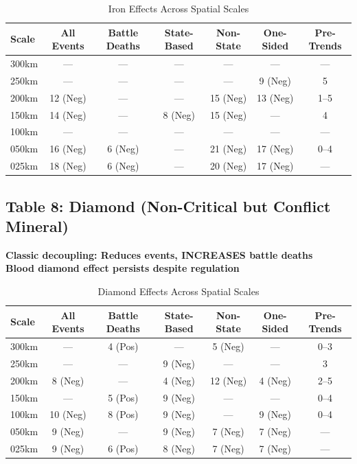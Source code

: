\documentclass[11pt]{article}
\begin{document}
\begin{table}[H]
\centering
\caption{Iron Effects Across Spatial Scales}
\begin{tabular}{lcccccc}
\toprule
Scale & All Events & Battle Deaths & State-Based & Non-State & One-Sided & Pre-Trends \\
\midrule
300km & ---       & ---           & ---         & ---       & ---       & ---        \\
250km & ---       & ---           & ---         & ---       & 9 (Neg)   & 5          \\
200km & 12 (Neg)  & ---           & ---         & 15 (Neg)  & 13 (Neg)  & 1--5       \\
150km & 14 (Neg)  & ---           & 8 (Neg)     & 15 (Neg)  & ---       & 4          \\
100km & ---       & ---           & ---         & ---       & ---       & ---        \\
050km & 16 (Neg)  & 6 (Neg)       & ---         & 21 (Neg)  & 17 (Neg)  & 0--4       \\
025km & 18 (Neg)  & 6 (Neg)       & ---         & 20 (Neg)  & 17 (Neg)  & ---        \\
\bottomrule
\end{tabular}
\end{table}

\subsection{Table 8: Diamond (Non-Critical but Conflict Mineral)}

\textbf{Classic decoupling: Reduces events, INCREASES battle deaths}\\
\textbf{Blood diamond effect persists despite regulation}

\begin{table}[H]
\centering
\caption{Diamond Effects Across Spatial Scales}
\begin{tabular}{lcccccc}
\toprule
Scale & All Events & Battle Deaths & State-Based & Non-State & One-Sided & Pre-Trends \\
\midrule
300km & ---       & 4 (Pos)       & ---         & 5 (Neg)   & ---       & 0--3       \\
250km & ---       & ---           & 9 (Neg)     & ---       & ---       & 3          \\
200km & 8 (Neg)   & ---           & 4 (Neg)     & 12 (Neg)  & 4 (Neg)   & 2--5       \\
150km & ---       & 5 (Pos)       & 9 (Neg)     & ---       & ---       & 0--4       \\
100km & 10 (Neg)  & 8 (Pos)       & 9 (Neg)     & ---       & 9 (Neg)   & 0--4       \\
050km & 9 (Neg)   & ---           & 9 (Neg)     & 7 (Neg)   & 7 (Neg)   & ---        \\
025km & 9 (Neg)   & 6 (Pos)       & 8 (Neg)     & 7 (Neg)   & 7 (Neg)   & ---        \\
\bottomrule
\end{tabular}
\end{table}
\end{document}

